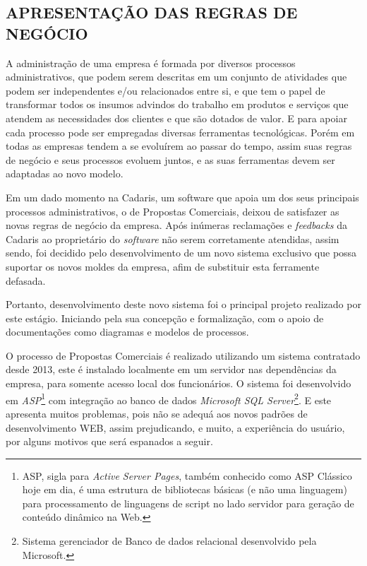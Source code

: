 \documentclass[
  12pt,				%
  openany,
  oneside,
  a4paper,			%
  english,			%
  brazil
]{article}
\numberwithin{figure}{section}
\numberwithin{table}{section}
\begin{document}
\subsection{APRESENTAÇÃO DAS REGRAS DE NEGÓCIO}


A administração de uma empresa é formada por diversos processos administrativos, que podem serem descritas em um conjunto de atividades que podem ser independentes e/ou relacionados entre si, e que tem o papel de transformar todos os insumos advindos do trabalho em produtos e serviços que atendem as necessidades dos clientes e que são dotados de valor.
E para apoiar cada processo pode ser empregadas diversas ferramentas tecnológicas. Porém em todas as empresas tendem a se evoluírem ao passar do tempo, assim suas regras de negócio e seus processos evoluem juntos, e as suas ferramentas devem ser adaptadas ao novo modelo. 

Em um dado momento na Cadaris, um software que apoia um dos seus principais processos administrativos, o de Propostas Comerciais, deixou de satisfazer as novas regras de negócio da empresa. Após inúmeras reclamações e \textit{feedbacks} da Cadaris ao proprietário do \textit{software} não serem corretamente atendidas, assim sendo, foi decidido pelo desenvolvimento de um novo sistema exclusivo que possa suportar os novos moldes da empresa, afim de substituir esta ferramente defasada.

Portanto, desenvolvimento deste novo sistema foi o principal projeto realizado por este estágio. Iniciando pela sua concepção e formalização, com o apoio de documentações como diagramas e modelos de processos.

O processo de Propostas Comerciais é realizado utilizando um sistema contratado desde 2013, este é instalado localmente em um servidor nas dependências da empresa, para somente acesso local dos funcionários. 
O sistema foi desenvolvido em \textit{ASP}\footnote{ASP, sigla para \textit{Active Server Pages}, também conhecido como ASP Clássico hoje em dia, é uma estrutura de bibliotecas básicas (e não uma linguagem) para processamento de linguagens de script no lado servidor para geração de conteúdo dinâmico na Web.} com integração ao banco de dados \textit{Microsoft SQL Server}\footnote{Sistema gerenciador de Banco de dados relacional desenvolvido pela Microsoft.}. 
E este apresenta muitos problemas, pois não se adequá aos novos padrões de desenvolvimento WEB, assim prejudicando, e muito, a experiência do usuário, por alguns motivos que será espanados a seguir.
\end{document}
